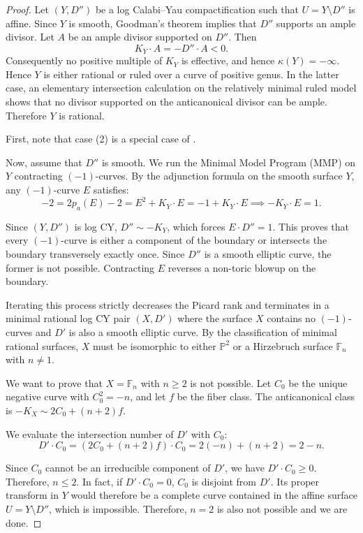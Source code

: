 \documentclass[11pt, reqno]{amsart}
\theoremstyle{definition}
\begin{document}
\begin{proof}

Let $(Y,D'')$ be a log Calabi--Yau compactification such that $U=Y\setminus D''$ is affine. Since $Y$ is smooth, Goodman's theorem \cite[Theorem~2]{Goodman1969} implies that $D''$ supports an ample divisor. Let \(A\) be an ample divisor supported on \(D''\). Then
\[
K_Y\cdot A=-D''\cdot A<0.
\]
Consequently no positive multiple of \(K_Y\) is effective, and hence
\(\kappa(Y)=-\infty\). Hence $Y$ is either rational or ruled over a curve of positive genus. In the latter case, an elementary intersection calculation on the relatively minimal ruled model shows that no divisor supported on the anticanonical divisor can be ample. Therefore $Y$ is rational.

First, note that case (2) is a special case of \cite[Proposition 1.3]{GHK15}. 

Now, assume that $D''$ is smooth. We run the Minimal Model Program (MMP) on $Y$ contracting $(-1)$-curves. By the adjunction formula on the smooth surface $Y$, any $(-1)$-curve $E$ satisfies:
\[
-2 = 2p_a(E) - 2 = E^2 + K_Y \cdot E = -1 + K_Y \cdot E \implies -K_Y \cdot E = 1.
\]

Since $(Y, D'')$ is log CY, $D'' \sim -K_Y$, which forces $E \cdot D'' = 1$. This proves that every $(-1)$-curve is either a component of the boundary or intersects the boundary transversely exactly once. Since $D''$ is a smooth elliptic curve, the former is not possible. Contracting $E$ reverses a non-toric blowup on the boundary.

Iterating this process strictly decreases the Picard rank and terminates in a minimal rational log CY pair $(X, D')$ where the surface $X$ contains  no $(-1)$-curves and $D'$ is also a smooth elliptic curve. By the classification of minimal rational surfaces, $X$ must be isomorphic to either $\mathbb{P}^2$ or a Hirzebruch surface $\mathbb{F}_n$ with $n \neq 1$. 

We want to prove that $X=\mathbb{F}_n$ with $n\geq 2$ is not possible. Let $C_0$ be the unique negative curve with $C_0^2 = -n$, and let $f$ be the fiber class. The anticanonical class is $-K_X \sim 2C_0 + (n+2)f$.

We evaluate the intersection number of $D'$ with $C_0$:
\[
D' \cdot C_0 = (2C_0 + (n+2)f) \cdot C_0 = 2(-n) + (n+2) = 2 - n.
\]

Since $C_0$ cannot be an irreducible component of $D'$, we have $D' \cdot C_0\geq 0$. Therefore, $n\leq 2.$ In fact, if $D' \cdot C_0= 0$,  $C_0$ is disjoint from $D'$. Its proper transform in $Y$ would therefore be a complete curve
contained in the affine surface $U=Y\setminus D''$, which is
impossible. Therefore, $n=2$ is also not possible and we are done.


\end{proof}
\end{document}
